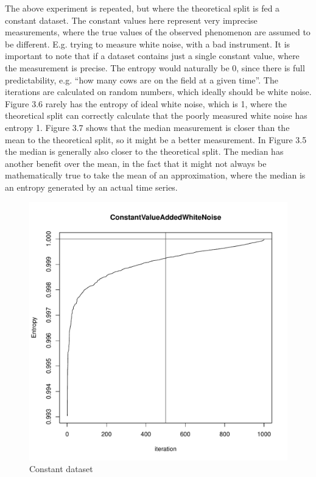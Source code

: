 The above experiment is repeated, but where the theoretical split is fed a constant dataset. The constant values here represent very imprecise measurements, where the true values of the observed phenomenon are assumed to be different. E.g. trying to measure white noise, with a bad instrument. It is important to note that if a dataset contains just a single constant value, where the measurement is precise. The entropy would naturally be 0, since there is full predictability, e.g. “how many cows are on the field at a given time”. The iterations are calculated on random numbers, which ideally should be white noise. Figure 3.6 rarely has the entropy of ideal white noise, which is 1, where the theoretical split can correctly calculate that the poorly measured white noise has entropy 1. Figure 3.7 shows that the median measurement is closer than the mean to the theoretical split, so it might be a better measurement. In Figure 3.5 the median is generally also closer to the theoretical split. The median has another benefit over the mean, in the fact that it might not always be mathematically true to take the mean of an approximation, where the median is an entropy generated by an actual time series.

\begin{figure}
    \centering
\includegraphics[width=\textwidth,keepaspectratio]{../../Weather/constantWithWhiteNoiseStochasticTheoretical.pdf}
    \caption{Constant dataset}
\end{figure}

